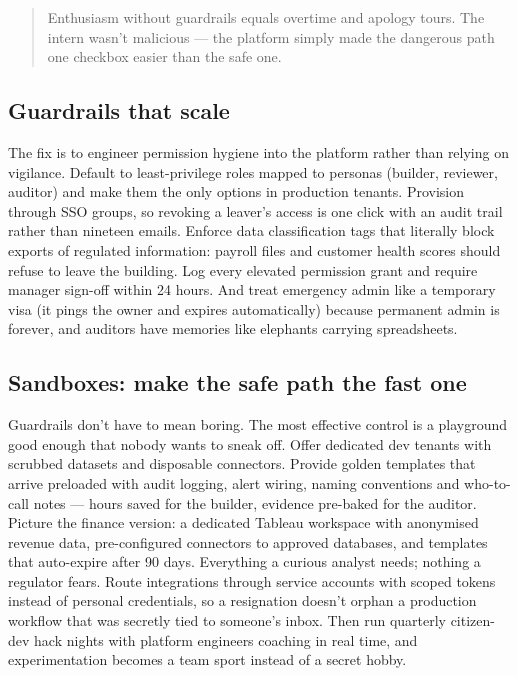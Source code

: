 \begin{quote}\small
Enthusiasm without guardrails equals overtime and apology tours. The intern wasn't malicious — the platform simply made the dangerous path one checkbox easier than the safe one.
\end{quote}



\subsection{Guardrails that scale}


The fix is to engineer permission hygiene into the platform rather than relying on vigilance. Default to least-privilege roles mapped to personas (builder, reviewer, auditor) and make them the only options in production tenants. Provision through SSO groups, so revoking a leaver's access is one click with an audit trail rather than nineteen emails. Enforce data classification tags that literally block exports of regulated information: payroll files and customer health scores should refuse to leave the building. Log every elevated permission grant and require manager sign-off within 24 hours. And treat emergency admin like a temporary visa (it pings the owner and expires automatically) because permanent admin is forever, and auditors have memories like elephants carrying spreadsheets.



\subsection{Sandboxes: make the safe path the fast one}


Guardrails don't have to mean boring. The most effective control is a playground good enough that nobody wants to sneak off. Offer dedicated dev tenants with scrubbed datasets and disposable connectors. Provide golden templates that arrive preloaded with audit logging, alert wiring, naming conventions and who-to-call notes — hours saved for the builder, evidence pre-baked for the auditor. Picture the finance version: a dedicated Tableau workspace with anonymised revenue data, pre-configured connectors to approved databases, and templates that auto-expire after 90 days. Everything a curious analyst needs; nothing a regulator fears. Route integrations through service accounts with scoped tokens instead of personal credentials, so a resignation doesn't orphan a production workflow that was secretly tied to someone's inbox. Then run quarterly citizen-dev hack nights with platform engineers coaching in real time, and experimentation becomes a team sport instead of a secret hobby.



